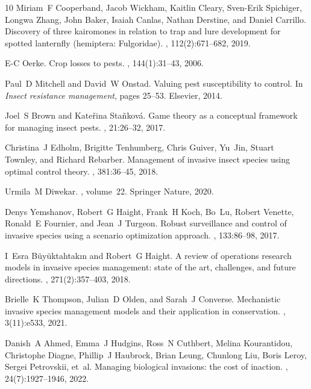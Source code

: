\documentclass[onecolumn]{article}
\begin{document}
{\begin{thebibliography}{10}
Miriam~F Cooperband, Jacob Wickham, Kaitlin Cleary, Sven-Erik Spichiger, Longwa Zhang, John Baker, Isaiah Canlas, Nathan Derstine, and Daniel Carrillo.
\newblock Discovery of three kairomones in relation to trap and lure development for spotted lanternfly (hemiptera: Fulgoridae).
, 112(2):671--682, 2019.

E-C Oerke.
\newblock Crop losses to pests.
, 144(1):31--43, 2006.

Paul~D Mitchell and David~W Onstad.
\newblock Valuing pest susceptibility to control.
\newblock In {\em Insect resistance management}, pages 25--53. Elsevier, 2014.

Joel~S Brown and Kate{\v{r}}ina Sta{\v{n}}kov{\'a}.
\newblock Game theory as a conceptual framework for managing insect pests.
, 21:26--32, 2017.

Christina~J Edholm, Brigitte Tenhumberg, Chris Guiver, Yu~Jin, Stuart Townley, and Richard Rebarber.
\newblock Management of invasive insect species using optimal control theory.
, 381:36--45, 2018.

Urmila~M Diwekar.
, volume~22.
\newblock Springer Nature, 2020.

Denys Yemshanov, Robert~G Haight, Frank~H Koch, Bo~Lu, Robert Venette, Ronald~E Fournier, and Jean~J Turgeon.
\newblock Robust surveillance and control of invasive species using a scenario optimization approach.
, 133:86--98, 2017.

I~Esra B{\"u}y{\"u}ktahtak{\i}n and Robert~G Haight.
\newblock A review of operations research models in invasive species management: state of the art, challenges, and future directions.
, 271(2):357--403, 2018.

Brielle~K Thompson, Julian~D Olden, and Sarah~J Converse.
\newblock Mechanistic invasive species management models and their application in conservation.
, 3(11):e533, 2021.

Danish~A Ahmed, Emma~J Hudgins, Ross~N Cuthbert, Melina Kourantidou, Christophe Diagne, Phillip~J Haubrock, Brian Leung, Chunlong Liu, Boris Leroy, Sergei Petrovskii, et~al.
\newblock Managing biological invasions: the cost of inaction.
, 24(7):1927--1946, 2022.


\end{thebibliography}}
\end{document}
